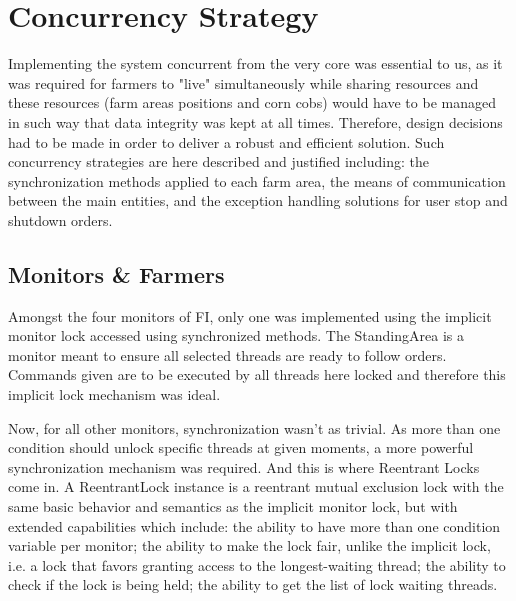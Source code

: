 \documentclass[12pt]{article}
\begin{document}
\newpage
\section{Concurrency Strategy} %

Implementing the system concurrent from the very core was essential to us, as it was required for farmers to "live" simultaneously while sharing resources and 
these resources (farm areas positions and corn cobs) would have to be managed in such way that data integrity was kept at all times.
Therefore, design decisions had to be made in order to deliver a robust and efficient solution.
Such concurrency strategies are here described and justified including: the synchronization methods applied to each farm area, the means of communication between
the main entities, and the exception handling solutions for user stop and shutdown orders.

\subsection{Monitors \& Farmers} \label{monitors} %

Amongst the four monitors of FI, only one was implemented using the implicit monitor lock accessed using synchronized methods.
The StandingArea is a monitor meant to ensure all selected threads are ready to follow orders.
Commands given are to be executed by all threads here locked and therefore this implicit lock mechanism was ideal.

Now, for all other monitors, synchronization wasn't as trivial.
As more than one condition should unlock specific threads at given moments, a more powerful synchronization mechanism was required.
And this is where Reentrant Locks come in.
A ReentrantLock \cite{reentrantlock} instance is a reentrant mutual exclusion lock with the same basic behavior and semantics as the implicit monitor lock, 
but with extended capabilities which include: the ability to have more than one condition variable per monitor; the ability to make the lock fair, unlike the 
implicit lock, i.e. a lock that favors granting access to the longest-waiting thread; the ability to check if the lock is being held; the ability to get the 
list of lock waiting threads.
\end{document}
